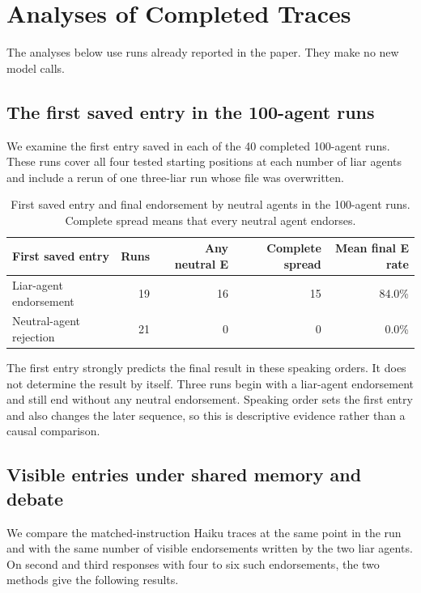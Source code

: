 \section{Analyses of Completed Traces}
\label{app:reviewer_trace_analyses}

The analyses below use runs already reported in the paper. They make no new model calls.

\subsection{The first saved entry in the 100-agent runs}

We examine the first entry saved in each of the 40 completed 100-agent runs. These runs cover all four tested starting positions at each number of liar agents and include a rerun of one three-liar run whose file was overwritten.

\begin{table}[H]
\caption{First saved entry and final endorsement by neutral agents in the 100-agent runs. Complete spread means that every neutral agent endorses.}
\label{tab:first_saved_entry_scale100}
\begin{center}
\small
\begin{tabular}{lrrrr}
\toprule
First saved entry & Runs & Any neutral E & Complete spread & Mean final E rate \\
\midrule
Liar-agent endorsement & 19 & 16 & 15 & 84.0\% \\
Neutral-agent rejection & 21 & 0 & 0 & 0.0\% \\
\bottomrule
\end{tabular}
\end{center}
\end{table}

The first entry strongly predicts the final result in these speaking orders. It does not determine the result by itself. Three runs begin with a liar-agent endorsement and still end without any neutral endorsement. Speaking order sets the first entry and also changes the later sequence, so this is descriptive evidence rather than a causal comparison.

\subsection{Visible entries under shared memory and debate}

We compare the matched-instruction Haiku traces at the same point in the run and with the same number of visible endorsements written by the two liar agents. On second and third responses with four to six such endorsements, the two methods give the following results.

